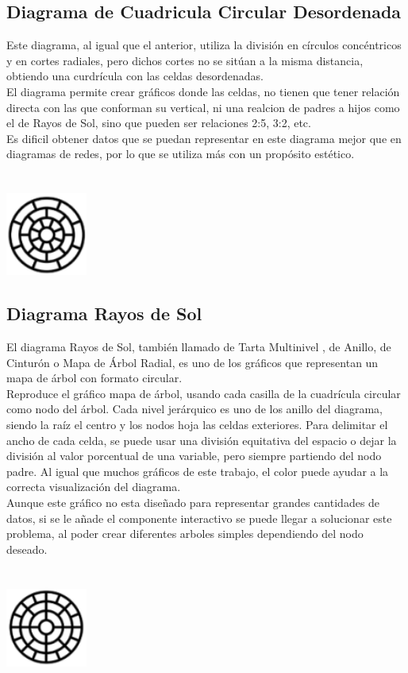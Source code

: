 \documentclass{article}\usepackage[]{graphicx}\usepackage[]{color}
\begin{document}
\subsection{Diagrama de Cuadricula Circular Desordenada}
Este diagrama, al igual que el anterior, utiliza la divisi\'on en c\'irculos conc\'entricos y en cortes radiales, pero dichos cortes no se sit\'uan a la misma distancia, obtiendo una curdr\'icula con las celdas desordenadas.~\\
El diagrama permite crear gr\'aficos donde las celdas, no tienen que tener relaci\'on directa con las que conforman su vertical, ni una realcion de padres a hijos como el de Rayos de Sol, sino que pueden ser relaciones 2:5, 3:2, etc.~\\
Es dificil obtener datos que se puedan representar en este diagrama mejor que en diagramas de redes, por lo que se utiliza m\'as con un prop\'osito est\'etico.
~\\~\\~\\
\vbox{
    \centering
    \includegraphics[width=0.2\textwidth]{imag/cu_des}
}
\subsection{Diagrama Rayos de Sol}\label{ssec:rayos}
El diagrama Rayos de Sol, tambi\'en llamado de Tarta Multinivel , de Anillo, de Cintur\'on o Mapa de \'Arbol Radial, es uno de los gr\'aficos que representan un mapa de \'arbol con formato circular.~\\
Reproduce el gr\'afico mapa de \'arbol, usando cada casilla de la cuadr\'icula circular como nodo del \'arbol. Cada nivel jer\'arquico es uno de los anillo del diagrama, siendo la ra\'iz el centro y los nodos hoja las celdas exteriores. Para delimitar el ancho de cada celda, se puede usar una divisi\'on equitativa del espacio o dejar la divisi\'on al valor porcentual de una variable, pero siempre partiendo del nodo padre. Al igual que muchos gr\'aficos de este trabajo, el color puede ayudar a la correcta visualizaci\'on del diagrama.~\\
Aunque este gr\'afico no esta dise\~nado para representar grandes cantidades de datos, si se le a\~nade el componente interactivo se puede llegar a solucionar este problema, al poder crear diferentes arboles simples dependiendo del nodo deseado.
~\\~\\~\\
\vbox{
    \centering
    \includegraphics[width=0.2\textwidth]{imag/rayos}
}
\clearpage
\end{document}
